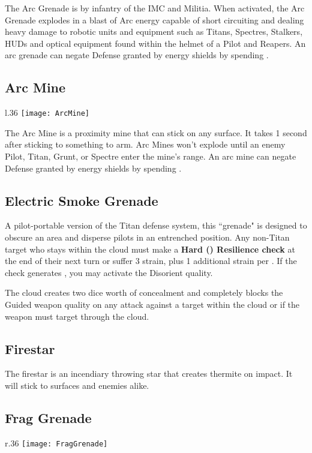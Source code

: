 The Arc Grenade is by infantry of the IMC and Militia. When activated, the Arc Grenade explodes in a blast of Arc energy capable of short circuiting and dealing heavy damage to robotic units and equipment such as Titans, Spectres, Stalkers, HUDs and optical equipment found within the helmet of a Pilot and Reapers. An arc grenade can negate Defense granted by energy shields by spending \Advantage\Advantage.

\subsection{Arc Mine}
\begin{wrapfigure}[6]{l}{.36\linewidth}
\vspace*{-2em}\centering
\texttt{[image: ArcMine]}
\end{wrapfigure}

The Arc Mine is a proximity mine that can stick on any surface. It takes 1 second after sticking to something to arm. Arc Mines won't explode until an enemy Pilot, Titan, Grunt, or Spectre enter the mine's range. An arc mine can negate Defense granted by energy shields by spending \Advantage\Advantage.

\subsection{Electric Smoke Grenade}
A pilot-portable version of the Titan defense system, this ``grenade" is designed to obscure an area and disperse pilots in an entrenched position. Any non-Titan target who stays within the cloud must make a \textbf{Hard (\DifficultyDie\DifficultyDie\DifficultyDie) Resilience check} at the end of their next turn or suffer 3 strain, plus 1 additional strain per \Failure. If the check generates \Threat\Threat, you may activate the Disorient quality.

The cloud creates two dice worth of concealment and completely blocks the Guided weapon quality on any attack against a target within the cloud or if the weapon must target through the cloud.

\subsection{Firestar}
The firestar is an incendiary throwing star that creates thermite on impact. It will stick to surfaces and enemies alike.


\subsection{Frag Grenade}
\begin{wrapfigure}[2]{r}{.36\linewidth}
\vspace*{-2em}
\texttt{[image: FragGrenade]}
\end{wrapfigure}

